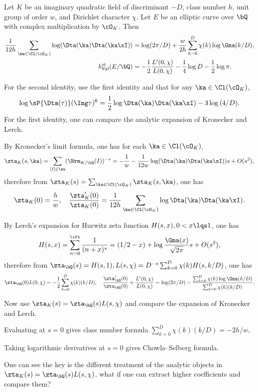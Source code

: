 \documentclass[a4paper, twoside]{article}
\begin{document}


\begin{thm}
	Let $K$ be an imaginary quadratic field of discriminant $-D$, class number $h$, unit group of order $w$, and Dirichlet character $\chi$. Let $E$ be an elliptic curve over $\bQ$ with complex multiplication by $\cO_{K}$. Then
	\begin{align*}
	  \frac{1}{12h}\sum_{\ka\in\Cl(\cO_{K})}\log(\Dta(\ka)\Dta(\ka\xI))&=\log(2\pi/D)+\frac{w}{2h}\sum_{k=0}^{D}\chi(k)\log\Gma(k/D), \\
	  h_{\mathrm{Fal}}^{\mathrm{st}}(E/\bQ)&=-\frac{1}{2}\frac{L'(0,\chi)}{L(0,\chi)}-\frac{1}{4}\log{D}-\frac{1}{2}\log{\pi}.
	\end{align*}

\end{thm}

\begin{prf}
	For the second identity, use the first identity and that for any $\ka\in\Cl(\cO_{K})$,
	\[
		\log{\sP{\Dta(\tau)}(\Img\tau)^{6}}=\frac{1}{2}\log{\Dta(\ka)\Dta(\ka\xI)}-3\log{(4/D)}.
	\]
	For the first identity, one can compare the analytic expansion of Kronecker and Lerch.

	 By Kronecker's limit formula, one has for each $\ka\in\Cl(\cO_{K})$,
	\[
	  \zta_{K}(s,\ka)=\sum_{[I]\in\ka}(\Nrm_{K/\bQ}(I))^{-s}=-\frac{1}{w}-\frac{1}{12w}\log(\Dta(\ka)\Dta(\ka\xI))s+O(s^{2}),
	\]
	therefore from $\zta_{K}(s)=\sum_{\ka\in\Cl(\cO_{K})}\zta_{K}(s,\ka)$, one has
	\[
		\zta_{K}(0)=\frac{h}{w},\quad \frac{\zta_{K}'(0)}{\zta_{K}(0)}=\frac{1}{12h}\sum_{\ka\in\Cl(\cO_{K})}\log{\Dta(\ka)\Dta(\ka\xI)}.
	\]

	 By Lerch's expansion for Hurwitz zeta function $H(s,x), 0<x\lqs1$, one has
	\[
		H(s,x)=\sum_{n=0}^{\ift}\frac{1}{(n+x)^{s}}=(1/2-x)+\log{\frac{\Gma(x)}{\sqrt{2\pi}}}s+O(s^{2}),
	\]
	therefore from $\zta_{\bQ}(s)=H(s,1), L(s,\chi)=D^{-s}\sum_{k=0}^{D}\chi(k)H(s,k/D)$, one has
	\[
		\zta_{\bQ}(0)L(0,\chi)=-\frac{1}{2}\sum_{k=0}^{D}\chi(k)(k/D),\quad \frac{\zta_{\bQ}'(0)}{\zta_{\bQ}(0)}+\frac{L'(0,\chi)}{L(0,\chi)}=\log(2\pi/D)-\frac{\sum_{k=0}^{D}\chi(k)\log\Gma(k/D)}{\sum_{k=0}^{D}\chi(k)(k/D)}.
  	\]

	 Now use $\zta_{K}(s)=\zta_{\bQ}(s)L(s,\chi)$ and compare the expansion of Kronecker and Lerch.
	\begin{itm}
		\item Evaluating at $s=0$ gives class number formula $\sum_{k=0}^{D}\chi(k)(k/D)=-2h/w$,
		\item Taking logarithmic derivatives at $s=0$ gives Chowla--Selberg formula.
	\end{itm}
\end{prf}
\begin{qst}
	One can see the key is the different treatment of the analytic objects in $\zta_{K}(s)=\zta_{\bQ}(s)L(s,\chi)$, what if one can extract higher coefficients and compare them?

\end{qst}
\end{document}

